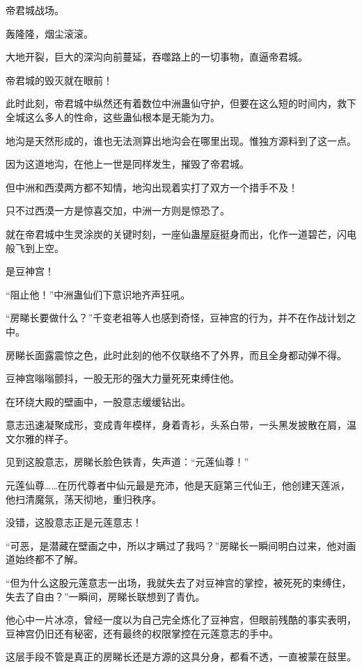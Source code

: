 
\begin{this_body}

帝君城战场。

轰隆隆，烟尘滚滚。

大地开裂，巨大的深沟向前蔓延，吞噬路上的一切事物，直逼帝君城。

帝君城的毁灭就在眼前！

此时此刻，帝君城中纵然还有着数位中洲蛊仙守护，但要在这么短的时间内，救下全城这么多人的性命，这些蛊仙根本是无能为力。

地沟是天然形成的，谁也无法测算出地沟会在哪里出现。惟独方源料到了这一点。

因为这道地沟，在他上一世是同样发生，摧毁了帝君城。

但中洲和西漠两方都不知情，地沟出现着实打了双方一个措手不及！

只不过西漠一方是惊喜交加，中洲一方则是惊恐了。

就在帝君城中生灵涂炭的关键时刻，一座仙蛊屋庭挺身而出，化作一道碧芒，闪电般飞到上空。

是豆神宫！

“阻止他！”中洲蛊仙们下意识地齐声狂吼。

“房睇长要做什么？”千变老祖等人也感到奇怪，豆神宫的行为，并不在作战计划之中。

房睇长面露震惊之色，此时此刻的他不仅联络不了外界，而且全身都动弹不得。

豆神宫嗡嗡颤抖，一股无形的强大力量死死束缚住他。

在环绕大殿的壁画中，一股意志缓缓钻出。

意志迅速凝聚成形，变成青年模样，身着青衫，头系白带，一头黑发披散在肩，温文尔雅的样子。

见到这股意志，房睇长脸色铁青，失声道：“元莲仙尊！”

元莲仙尊……在历代尊者中仙元最是充沛，他是天庭第三代仙王，他创建天莲派，他扫清魔氛，荡天彻地，重归秩序。

没错，这股意志正是元莲意志！

“可恶，是潜藏在壁画之中，所以才瞒过了我吗？”房睇长一瞬间明白过来，他对画道始终都不了解。

“但为什么这股元莲意志一出场，我就失去了对豆神宫的掌控，被死死的束缚住，失去了自由？”一瞬间，房睇长联想到了青仇。

他心中一片冰凉，曾经一度以为自己完全炼化了豆神宫，但眼前残酷的事实表明，豆神宫仍旧还有秘密，还有最终的权限掌控在元莲意志的手中。

这层手段不管是真正的房睇长还是方源的这具分身，都看不透，一直被蒙在鼓里。


\end{this_body}
